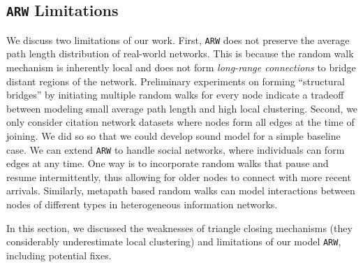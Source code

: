 \subsection{\texttt{ARW} Limitations}
We discuss two limitations of our work. First, \texttt{ARW} does not preserve the average
path length distribution of real-world networks. This is because the random walk
mechanism is inherently local and does not form \textit{long-range connections} to bridge
distant regions of the network. Preliminary experiments on forming ``structural bridges''
by initiating multiple random walks for every node indicate a tradeoff
between modeling small average path length and high local clustering. Second,
we only consider citation network datasets where nodes form all edges at the time of joining. We did so so that we could develop sound model for a simple baseline case. We can extend \texttt{ARW} to handle social networks, where individuals can form edges at any time. One way is to incorporate random walks that pause and resume intermittently, thus allowing for older nodes to connect with more recent arrivals.
Similarly, metapath based random walks can model interactions between
nodes of different types in heterogeneous information networks.

In this section, we discussed the weaknesses of triangle closing mechanisms
(they considerably underestimate local clustering) and limitations of our model
\texttt{ARW}, including potential fixes.
%

